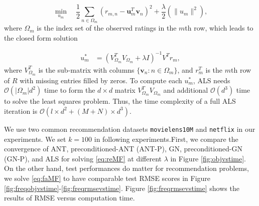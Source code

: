 \documentclass[11pt,twoside]{article}
\newcommand{\bsym}[1]{\ensuremath{\boldsymbol{#1}}}
\newcommand{\bu}{\ensuremath{\bsym{u}}}
\newcommand{\bv}{\ensuremath{\bsym{v}}}
\newcommand{\bbO}[1]{\ensuremath{\mathcal{O}\left(#1\right)}}
\begin{document}
\begin{equation}    
    \min_{u_m} \quad \frac{1}{2}\sum_{n \in \Omega_m}  (r_{m,n} - \bu_m^T \bv_n)^2+
    \frac{\lambda}{2} (\|u_m\|^2),
    \label{eq:subMF}
\end{equation}
where $\Omega_m$ is the index set of the observed ratings in the $m$th row, which leads to the closed form solution 

\begin{equation}
    \begin{aligned}
        u_m^* &= (V_{\Omega_m}^{T}V_{\Omega_m}+\lambda I)^{-1}V^{T}r_m,
    \label{eq:closedMF}
    \end{aligned}
\end{equation}
where $V_{\Omega_m}^{T}$ is the sub-matrix with columns $\{\bv_n:n \in \Omega_m\}$, and $r_m^T$ is the $m$th row of $R$ with missing entries ﬁlled by zeros. To compute each $u_m^*$, ALS needs $\bbO {|\Omega_m| d^2}$
time to form the $d \times d$ matrix $V_{\Omega_m}^{T}V_{\Omega_m}$ and additional $\bbO {d^3}$ time to solve the least squares problem. Thus, the time complexity of a full ALS iteration is $\bbO {l \times d^2 + (M+N) \times d^3}$.


We use two common recommendation datasets {\tt movielens10M} and {\tt netflix} in our experiments. We set $k=100$ in following experiments.First, we compare the convergence of ANT, preconditioned-ANT (ANT-P), GN, preconditioned-GN (GN-P), and ALS for solving \eqref{eq:reMF}  at different $\lambda$ in Figure \ref{fig:objvstime}. On the other hand, test performances do matter for recommendation problems, we solve \eqref{eq:faMF} to have comparable test RMSE scores in Figure \ref{fig:freqobjvstime}-\ref{fig:freqrmsevstime}.
Figure \ref{fig:freqrmsevstime} shows the results of RMSE versus computation time.
\end{document}
